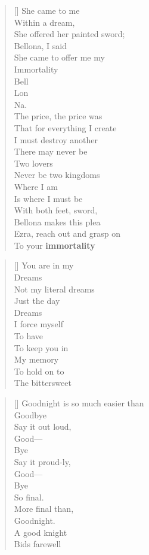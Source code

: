 \documentclass{article}
\begin{document}
\settowidth{\versewidth}{Than Tycho Brahe, or Erra Pater:}
\begin{verse}[\versewidth]
She came to me \\
Within a dream, \\
She offered her painted sword; \\
Bellona, I said \\
She came to offer me my \\
Immortality \\
Bell \\
Lon \\
Na. \\
The price, the price was \\
That for everything I create \\
I must destroy another \\
There may never be \\
Two lovers \\
Never be two kingdoms \\
Where I am \\
Is where I must be \\
With both feet, sword, \\
Bellona makes this plea \\
Ezra, reach out and grasp on \\
To your \textbf{immortality} \\
\end{verse}

\settowidth{\versewidth}{Than Tycho Brahe, or Erra Pater:}
\begin{verse}[\versewidth]
You are in my \\
Dreams \\
Not my literal dreams \\
Just the day \\
Dreams \\
I force myself \\
To have \\
To keep you in \\
My memory \\
To hold on to \\
The bittersweet \\
\end{verse}

\settowidth{\versewidth}{Than Tycho Brahe, or Erra Pater:}
\begin{verse}[\versewidth]
Goodnight is so much easier than \\ 
Goodbye \\
Say it out loud, \\
Good— \\
Bye \\
Say it proud-ly, \\
Good— \\
Bye \\
So final. \\
More final than, \\
Goodnight.\\
A good knight \\
Bids farewell \\
\end{verse}
\end{document}
